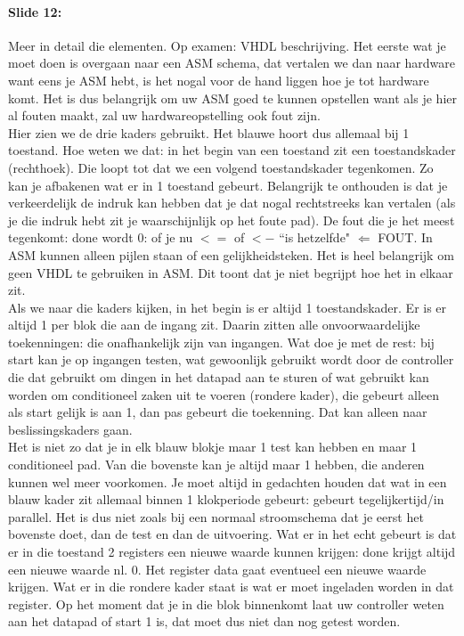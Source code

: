 \documentclass[10pt,a4paper]{book}
\begin{document}
\paragraph{Slide 12:} Meer in detail die elementen. Op examen: VHDL beschrijving. Het eerste wat je moet doen is overgaan naar een ASM schema, dat vertalen we dan naar hardware want eens je ASM hebt, is het nogal voor de hand liggen hoe je tot hardware komt. Het is dus belangrijk om uw ASM goed te kunnen opstellen want als je hier al fouten maakt, zal uw hardwareopstelling ook fout zijn.\\
Hier zien we de drie kaders gebruikt. Het blauwe hoort dus allemaal bij 1 toestand. Hoe weten we dat: in het begin van een toestand zit een toestandskader (rechthoek). Die loopt tot dat we een volgend toestandskader tegenkomen. Zo kan je afbakenen wat er in 1 toestand gebeurt. Belangrijk te onthouden is dat je verkeerdelijk de indruk kan hebben dat je dat nogal rechtstreeks kan vertalen (als je die indruk hebt zit je waarschijnlijk op het foute pad). De fout die je het meest tegenkomt: done wordt 0: of je nu $<=$ of $<-$ ``is hetzelfde" $\Leftarrow$ FOUT. In ASM kunnen alleen pijlen staan of een gelijkheidsteken. Het is heel belangrijk om geen VHDL te gebruiken in ASM. Dit toont dat je niet begrijpt hoe het in elkaar zit.\\
Als we naar die kaders kijken, in het begin is er altijd 1 toestandskader. Er is er altijd 1 per blok die aan de ingang zit. Daarin zitten alle onvoorwaardelijke toekenningen: die onafhankelijk zijn van ingangen. Wat doe je met de rest: bij start kan je op ingangen testen, wat gewoonlijk gebruikt wordt door de controller die dat gebruikt om dingen in het datapad aan te sturen of wat gebruikt kan worden om conditioneel zaken uit te voeren (rondere kader), die gebeurt alleen als start gelijk is aan 1, dan pas gebeurt die toekenning. Dat kan alleen naar beslissingskaders gaan.\\
Het is niet zo dat je in elk blauw blokje maar 1 test kan hebben en maar 1 conditioneel pad. Van die bovenste kan je altijd maar 1 hebben, die anderen kunnen wel meer voorkomen. Je moet altijd in gedachten houden dat wat in een blauw kader zit allemaal binnen 1 klokperiode gebeurt: gebeurt tegelijkertijd/in parallel. Het is dus niet zoals bij een normaal stroomschema dat je eerst het bovenste doet, dan de test en dan de uitvoering. Wat er in het echt gebeurt is dat er in die toestand 2 registers een nieuwe waarde kunnen krijgen: done krijgt altijd een nieuwe waarde nl. 0. Het register data gaat eventueel een nieuwe waarde krijgen. Wat er in die rondere kader staat is wat er moet ingeladen worden in dat register. Op het moment dat je in die blok binnenkomt laat uw controller weten aan het datapad of start 1 is, dat moet dus niet dan nog getest worden.\\
\end{document}
